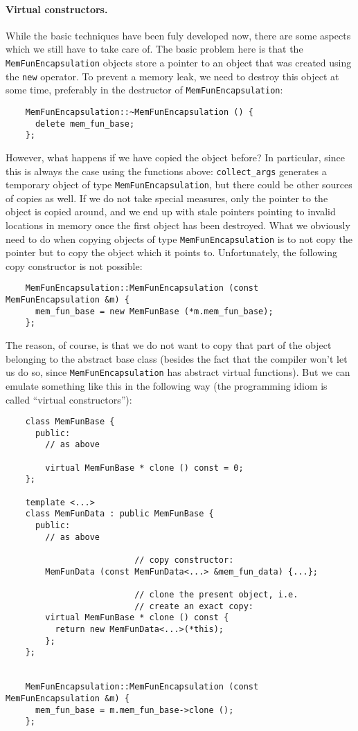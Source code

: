 \documentclass[11pt]{article}
\begin{document}
\paragraph{Virtual constructors.} While the basic techniques have been fuly
developed now, there are some aspects which we still have to take care of. The
basic problem here is that the \texttt{MemFunEncapsulation} objects store a
pointer to an object that was created using the \texttt{new} operator. To
prevent a memory leak, we need to destroy this object at some time, preferably
in the destructor of \texttt{MemFunEncapsulation}:
\begin{verbatim}
    MemFunEncapsulation::~MemFunEncapsulation () {
      delete mem_fun_base;
    };
\end{verbatim}
However, what happens if we have copied the object before? In particular,
since this is always the case using the functions above: \texttt{collect\_args}
generates a temporary object of type \texttt{MemFunEncapsulation}, but there
could be other sources of copies as well. If we do not take special measures,
only the pointer to the object is copied around, and we end up with stale
pointers pointing to invalid locations in memory once the first object has
been destroyed. What we obviously need to do when copying objects of type
\texttt{MemFunEncapsulation} is to not copy the pointer but to copy the object
which it points to. Unfortunately, the following copy constructor is not
possible:
\begin{verbatim}
    MemFunEncapsulation::MemFunEncapsulation (const MemFunEncapsulation &m) {
      mem_fun_base = new MemFunBase (*m.mem_fun_base);
    };
\end{verbatim}
The reason, of course, is that we do not want to copy that part of the object
belonging to the abstract base class (besides the fact that the compiler won't
let us do so, since \texttt{MemFunEncapsulation} has abstract virtual
functions). But we can emulate something like this in the following way (the
programming idiom is called ``virtual constructors''):
\begin{verbatim}
    class MemFunBase {
      public:
        // as above

        virtual MemFunBase * clone () const = 0;
    };

    template <...>
    class MemFunData : public MemFunBase {
      public:
        // as above

                          // copy constructor:
        MemFunData (const MemFunData<...> &mem_fun_data) {...};

                          // clone the present object, i.e.
                          // create an exact copy:
        virtual MemFunBase * clone () const {
          return new MemFunData<...>(*this);
        };
    };


    MemFunEncapsulation::MemFunEncapsulation (const MemFunEncapsulation &m) {
      mem_fun_base = m.mem_fun_base->clone ();
    };
\end{verbatim}
\end{document}
